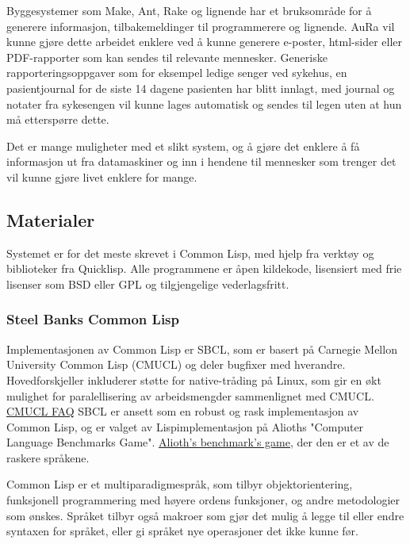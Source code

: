 \documentclass[11pt]{article}
\begin{document}
Byggesystemer som Make, Ant, Rake og lignende har et bruksområde for å generere informasjon, tilbakemeldinger til programmerere og lignende. AuRa vil kunne gjøre dette arbeidet enklere ved å kunne generere e-poster, html-sider eller PDF-rapporter som kan sendes til relevante mennesker.
Generiske rapporteringsoppgaver som for eksempel ledige senger ved sykehus, en pasientjournal for de siste 14 dagene pasienten har blitt innlagt, med journal og notater fra sykesengen vil kunne lages automatisk og sendes til legen uten at hun må etterspørre dette.



Det er mange muligheter med et slikt system, og å gjøre det enklere å få informasjon ut fra datamaskiner og inn i hendene til mennesker som trenger det vil kunne gjøre livet enklere for mange.




\subsection{Materialer}



Systemet er for det meste skrevet i Common Lisp, med hjelp fra verktøy og biblioteker fra Quicklisp.
Alle programmene er åpen kildekode, lisensiert med frie lisenser som BSD eller GPL og tilgjengelige vederlagsfritt.



\subsubsection{Steel Banks Common Lisp}



Implementasjonen av Common Lisp er SBCL, som er basert på Carnegie Mellon University Common Lisp (CMUCL) og deler bugfixer med hverandre.
Hovedforskjeller inkluderer støtte for native-tråding på Linux, som gir en økt mulighet for paralellisering av arbeidsmengder sammenlignet med CMUCL. \href{(http://www.cons.org/cmucl/FAQ.html}{CMUCL FAQ}
SBCL er ansett som en robust og rask implementasjon av Common Lisp, og er valget av Lispimplementasjon på Alioths "Computer Language Benchmarks Game". \href{(http://benchmarksgame.alioth.debian.org/}{Alioth's benchmark's game}, der den er et av de raskere språkene.



Common Lisp er et multiparadigmespråk, som tilbyr objektorientering, funksjonell programmering med høyere ordens funksjoner, og andre metodologier som ønskes. Språket tilbyr også makroer som gjør det mulig å legge til eller endre syntaxen for språket, eller gi språket nye operasjoner det ikke kunne før. 
\end{document}
